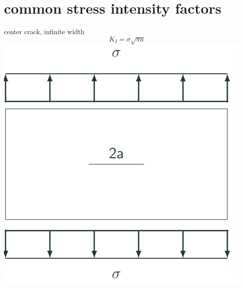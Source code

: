 \documentclass[
  letterpaper,
  ignorenonframetext,
  aspectratio=43,
  handout,
  12pt]{beamer}
\let\Oldincludegraphics\includegraphics
\renewcommand{\includegraphics}[2][]{\Oldincludegraphics[width=\textwidth,height=0.7\textheight,keepaspectratio]{#2}}
\begin{document}
\hypertarget{common-stress-intensity-factors}{%
\section{common stress intensity
factors}\label{common-stress-intensity-factors}}

\begin{frame}{center crack, infinite width}
\protect\hypertarget{center-crack-infinite-width}{}
\[K_I = \sigma \sqrt{\pi a}\]
\includegraphics{../images/center-infinite.svg}
\end{frame}
\end{document}
